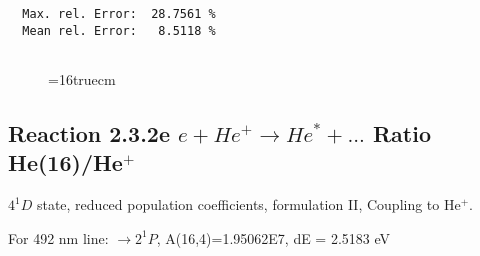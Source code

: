 \documentclass[12pt]{article}
\begin{document}
\begin{small}
\begin{verbatim}
  Max. rel. Error:  28.7561 %
  Mean rel. Error:   8.5118 %


\end{verbatim}\end{small}
\begin{figure} \label{2.3.2d}
\epsfxsize=16truecm
\end{figure}
\newpage


\subsection{
  Reaction 2.3.2e $e + He^+ \rightarrow He^* + ... $ Ratio He(16)/He$^+$
}

  $4^1D$ state,
  reduced population coefficients, formulation II,
  Coupling to He$^+$.

  For 492 nm line: $\rightarrow 2^1P$, A(16,4)=1.95062E7, dE = 2.5183 eV
\end{document}
